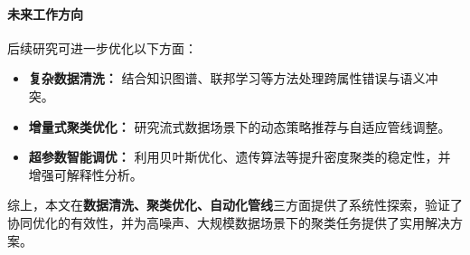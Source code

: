\documentclass[10pt]{article} %
\numberwithin{equation}{section}
\begin{document}
\paragraph{未来工作方向}  
后续研究可进一步优化以下方面：
\begin{itemize}
    \item \textbf{复杂数据清洗：} 结合知识图谱、联邦学习等方法处理跨属性错误与语义冲突。
    \item \textbf{增量式聚类优化：} 研究流式数据场景下的动态策略推荐与自适应管线调整。
    \item \textbf{超参数智能调优：} 利用贝叶斯优化、遗传算法等提升密度聚类的稳定性，并增强可解释性分析。
\end{itemize}

综上，本文在\textbf{数据清洗、聚类优化、自动化管线}三方面提供了系统性探索，验证了协同优化的有效性，并为高噪声、大规模数据场景下的聚类任务提供了实用解决方案。



\end{document}
